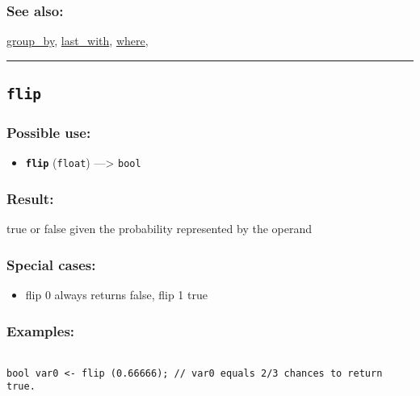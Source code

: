 \documentclass[]{book}
\providecommand{\tightlist}{%
  \setlength{\itemsep}{0pt}\setlength{\parskip}{0pt}}
\theoremstyle{definition}
\theoremstyle{definition}
\theoremstyle{definition}
\theoremstyle{remark}
\begin{document}
\subsubsection{See also:}\label{see-also-95}

\href{OperatorsDH\#group_by}{group\_by},
\href{OperatorsIM\#last_with}{last\_with},
\href{OperatorsSZ\#where}{where},

\begin{center}\rule{0.5\linewidth}{\linethickness}\end{center}

\subsection{\texorpdfstring{\texttt{flip}}{flip}}\label{flip}

\subsubsection{Possible use:}\label{possible-use-169}

\begin{itemize}
\tightlist
\item
  \textbf{\texttt{flip}} (\texttt{float}) ---\textgreater{}
  \texttt{bool}
\end{itemize}

\subsubsection{Result:}\label{result-163}

true or false given the probability represented by the operand

\subsubsection{Special cases:}\label{special-cases-63}

\begin{itemize}
\tightlist
\item
  flip 0 always returns false, flip 1 true
\end{itemize}

\subsubsection{Examples:}\label{examples-125}

\begin{verbatim}
 
bool var0 <- flip (0.66666); // var0 equals 2/3 chances to return true.
\end{verbatim}
\end{document}
